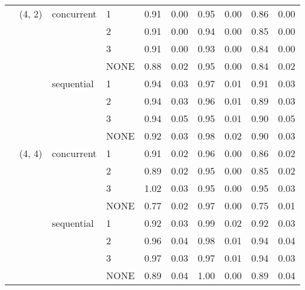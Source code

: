 \begin{tabular}{llllrrrrrr}
    & (4, 2) & concurrent & 1 &     0.91 & 0.00 &     0.95 & 0.00 &  0.86 & 0.00 \\
    &        &            & 2 &     0.91 & 0.00 &     0.94 & 0.00 &  0.85 & 0.00 \\
    &        &            & 3 &     0.91 & 0.00 &     0.93 & 0.00 &  0.84 & 0.00 \\
    &        &            & NONE &     0.88 & 0.02 &     0.95 & 0.00 &  0.84 & 0.02 \\
    &        & sequential & 1 &     0.94 & 0.03 &     0.97 & 0.01 &  0.91 & 0.03 \\
    &        &            & 2 &     0.94 & 0.03 &     0.96 & 0.01 &  0.89 & 0.03 \\
    &        &            & 3 &     0.94 & 0.05 &     0.95 & 0.01 &  0.90 & 0.05 \\
    &        &            & NONE &     0.92 & 0.03 &     0.98 & 0.02 &  0.90 & 0.03 \\
    & (4, 4) & concurrent & 1 &     0.91 & 0.02 &     0.96 & 0.00 &  0.86 & 0.02 \\
    &        &            & 2 &     0.89 & 0.02 &     0.95 & 0.00 &  0.85 & 0.02 \\
    &        &            & 3 &     1.02 & 0.03 &     0.95 & 0.00 &  0.95 & 0.03 \\
    &        &            & NONE &     0.77 & 0.02 &     0.97 & 0.00 &  0.75 & 0.01 \\
    &        & sequential & 1 &     0.92 & 0.03 &     0.99 & 0.02 &  0.92 & 0.03 \\
    &        &            & 2 &     0.96 & 0.04 &     0.98 & 0.01 &  0.94 & 0.04 \\
    &        &            & 3 &     0.97 & 0.03 &     0.97 & 0.01 &  0.94 & 0.03 \\
    &        &            & NONE &     0.89 & 0.04 &     1.00 & 0.00 &  0.89 & 0.04 \\
\bottomrule
\end{tabular}
